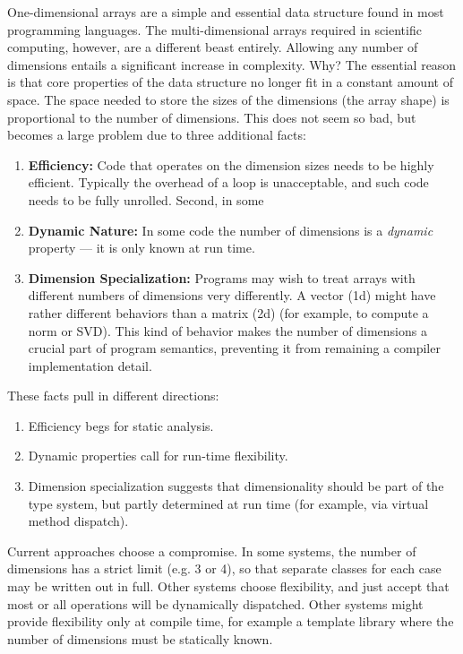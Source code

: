 \documentclass[preprint]{sigplanconf}
\begin{document}
One-dimensional arrays are a simple and essential data structure found in
most programming languages. The multi-dimensional arrays required in
scientific computing, however, are a different beast entirely. Allowing
any number of dimensions entails a significant increase in complexity. Why?
The essential reason is that core properties of the data structure no
longer fit in a constant amount of space. The space needed to store the
sizes of the dimensions (the array shape) is proportional to the number
of dimensions. This does not seem so bad, but becomes a large problem
due to three additional facts:

\begin{enumerate}
\item{\bf Efficiency:} Code that operates on the dimension
sizes needs to be highly efficient. Typically the overhead of a loop is
unacceptable, and such code needs to be fully unrolled. Second, in some

\item{\bf Dynamic Nature:} In some code the number of dimensions is a
\emph{dynamic} property --- it is only known at run time.

\item {\bf Dimension Specialization:} Programs may wish to treat arrays with
different numbers of dimensions very differently. A vector (1d) might
have rather different behaviors than a matrix (2d) (for example, to
compute a norm or SVD). This kind of
behavior makes the number of dimensions a crucial part of program
semantics, preventing it from remaining a compiler implementation detail.
\end{enumerate}


These facts pull in different directions:
\begin{enumerate}
\item Efficiency begs for static analysis.
\item Dynamic properties call for run-time flexibility.
\item Dimension specialization suggests that dimensionality should be part of
the type system, but partly determined at run time (for example, via virtual
method dispatch). 
\end{enumerate}

Current approaches choose a compromise. In some systems, the number of
dimensions has a strict limit (e.g. 3 or 4), so that separate classes for each
case may be written out in full. Other systems choose flexibility, and just
accept that most or all operations will be dynamically dispatched. Other
systems might provide flexibility only at compile time, for example a template
library where the number of dimensions must be statically known.
\end{document}
